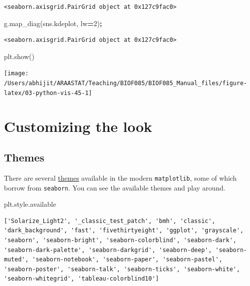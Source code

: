 \documentclass[
  letterpaper,
]{scrbook}
\newenvironment{Shaded}{\begin{snugshade}}{\end{snugshade}}
\newcommand{\DecValTok}[1]{\textcolor[rgb]{0.00,0.00,0.81}{#1}}
\newcommand{\NormalTok}[1]{#1}
\newcommand{\OperatorTok}[1]{\textcolor[rgb]{0.81,0.36,0.00}{\textbf{#1}}}
\begin{document}
\begin{verbatim}
<seaborn.axisgrid.PairGrid object at 0x127c9fac0>
\end{verbatim}

\begin{Shaded}
\begin{Highlighting}[]
\NormalTok{g.map_diag(sns.kdeplot, lw}\OperatorTok{=}\DecValTok{2}\NormalTok{)}\OperatorTok{;}
\end{Highlighting}
\end{Shaded}

\begin{verbatim}
<seaborn.axisgrid.PairGrid object at 0x127c9fac0>
\end{verbatim}

\begin{Shaded}
\begin{Highlighting}[]
\NormalTok{plt.show()}
\end{Highlighting}
\end{Shaded}

\begin{center}\texttt{[image: /Users/abhijit/ARAASTAT/Teaching/BIOF085/BIOF085\_Manual\_files/figure-latex/03-python-vis-45-1]} \end{center}

\hypertarget{customizing-the-look}{%
\section{Customizing the look}\label{customizing-the-look}}

\hypertarget{themes}{%
\subsection{Themes}\label{themes}}

There are several \href{https://matplotlib.org/3.2.1/gallery/style_sheets/style_sheets_reference.html}{themes} available in the modern \texttt{matplotlib}, some of which borrow from \texttt{seaborn}. You can see the available themes and play around.

\begin{Shaded}
\begin{Highlighting}[]
\NormalTok{plt.style.available}
\end{Highlighting}
\end{Shaded}

\begin{verbatim}
['Solarize_Light2', '_classic_test_patch', 'bmh', 'classic', 'dark_background', 'fast', 'fivethirtyeight', 'ggplot', 'grayscale', 'seaborn', 'seaborn-bright', 'seaborn-colorblind', 'seaborn-dark', 'seaborn-dark-palette', 'seaborn-darkgrid', 'seaborn-deep', 'seaborn-muted', 'seaborn-notebook', 'seaborn-paper', 'seaborn-pastel', 'seaborn-poster', 'seaborn-talk', 'seaborn-ticks', 'seaborn-white', 'seaborn-whitegrid', 'tableau-colorblind10']
\end{verbatim}
\end{document}
